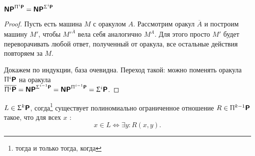 \begin{lm}
    $ \textmd{\textbf{\textsf{NP}}}^{\Uppi^{i}\textmd{\textbf{\textsf{P}}}} = \textmd{\textbf{\textsf{NP}}}^{\Upsigma^{i}\textmd{\textbf{\textsf{P}}}}$
\end{lm}
\begin{proof}
    Пусть есть машина $ M$ с оракулом $ A$. Рассмотрим оракул $ \overline{A}$ и построим машину $ M'$, чтобы $ M'^{\overline{A}}$ вела себя аналогично $ M^{A}$. Для этого просто $ M'$ будет переворачивать любой ответ, полученный от оракула, все остальные действия повторяем за $ M$.

	Докажем по индукции, база очевидна. Переход такой: можно поменять оракула $\Uppi^{i}\textmd{\textbf{\textsf{P}}}$ на оракула \\$\overline{\Uppi^{i}\textmd{\textbf{\textsf{P}}}} = \textmd{\textbf{\textsf{NP}}}^{\Upsigma^{i-1}\textmd{\textbf{\textsf{P}}}} = \textmd{\textbf{\textsf{NP}}}^{\Uppi^{i-1}\textmd{\textbf{\textsf{P}}}} = \Upsigma^{i}\textmd{\textbf{\textsf{P}}}$.
\end{proof}

\begin{thm}
    $ L \in \Upsigma^{k}\textmd{\textbf{\textsf{P}}}$, согда\footnote{тогда и только тогда, когда} существует полиномиально ограниченное отношение $ R \in \Uppi^{k-1}\textmd{\textbf{\textsf{P}}}$ такое, что для всех $ x$ :
	\[
		x \in L \Longleftrightarrow \exists y \colon R(x, y)
	.\] 
\end{thm}

